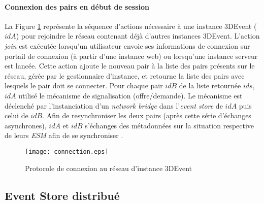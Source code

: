\paragraph{Connexion des pairs en début de session}

La Figure \ref{fig:connexionpairs} représente la séquence d'actions nécessaire à 
une instance 3DEvent ($idA$) pour rejoindre le réseau contenant déjà d'autres 
instances 3DEvent. L'action \textit{join} est exécutée lorsqu'un utilisateur envoie 
ses informations de connexion sur portail de connexion (à partir d'une instance 
web) ou lorsqu'une instance serveur est lancée. Cette action ajoute le nouveau 
pair à la liste des pairs présents sur le réseau, gérée par le gestionnaire 
d'instance, et retourne la liste des pairs avec lesquels le pair doit se connecter. 
Pour chaque pair $idB$ de la liste retournée $ids$, $idA$ utilisé le mécanisme de 
signalisation (offre/demande). Le mécanisme est déclenché par l'instanciation d'un 
\textit{network bridge} dans l'\textit{event store}  de $idA$ 
puis celui de $idB$. Afin de resynchroniser les deux pairs (après cette série 
d'échanges asynchrones), $idA$ et $idB$ s'échanges des métadonnées sur la 
situation respective de leurs \textit{ESM}  afin de se synchroniser 
.

\begin{figure}[t]
	\noindent
	\centering
	\texttt{[image: connection.eps]}
	\caption{Protocole de connexion au réseau d'instance 3DEvent}
	\label{fig:connexionpairs}
\end{figure}

\subsection{Event Store distribué}


